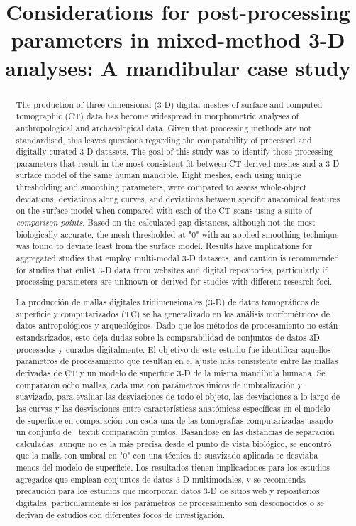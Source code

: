 \documentclass[review]{elsarticle}
\begin{document}
\begin{frontmatter}

\title{Considerations for post-processing parameters in mixed-method 3-D analyses: A mandibular case study}


\begin{abstract}
The production of three-dimensional (3-D) digital meshes of surface and computed tomographic (CT) data has become widespread in morphometric analyses of anthropological and archaeological data. Given that processing methods are not standardised, this leaves questions regarding the comparability of processed and digitally curated 3-D datasets. The goal of this study was to identify those processing parameters that result in the most consistent fit between CT-derived meshes and a 3-D surface model of the same human mandible. Eight meshes, each using unique thresholding and smoothing parameters, were compared to assess whole-object deviations, deviations along curves, and deviations between specific anatomical features on the surface model when compared with each of the CT scans using a suite of \textit{comparison points}. Based on the calculated gap distances, although not the most biologically accurate, the mesh thresholded at "0" with an applied smoothing technique was found to deviate least from the surface model. Results have implications for aggregated studies that employ multi-modal 3-D datasets, and caution is recommended for studies that enlist 3-D data from websites and digital repositories, particularly if processing parameters are unknown or derived for studies with different research foci.

\newpage
La producción de mallas digitales tridimensionales (3-D) de datos tomográficos de superficie y computarizados (TC) se ha generalizado en los análisis morfométricos de datos antropológicos y arqueológicos. Dado que los métodos de procesamiento no están estandarizados, esto deja dudas sobre la comparabilidad de conjuntos de datos 3D procesados ​​y curados digitalmente. El objetivo de este estudio fue identificar aquellos parámetros de procesamiento que resultan en el ajuste más consistente entre las mallas derivadas de CT y un modelo de superficie 3-D de la misma mandíbula humana. Se compararon ocho mallas, cada una con parámetros únicos de umbralización y suavizado, para evaluar las desviaciones de todo el objeto, las desviaciones a lo largo de las curvas y las desviaciones entre características anatómicas específicas en el modelo de superficie en comparación con cada una de las tomografías computarizadas usando un conjunto de \ textit {comparación puntos}. Basándose en las distancias de separación calculadas, aunque no es la más precisa desde el punto de vista biológico, se encontró que la malla con umbral en "0" con una técnica de suavizado aplicada se desviaba menos del modelo de superficie. Los resultados tienen implicaciones para los estudios agregados que emplean conjuntos de datos 3-D multimodales, y se recomienda precaución para los estudios que incorporan datos 3-D de sitios web y repositorios digitales, particularmente si los parámetros de procesamiento son desconocidos o se derivan de estudios con diferentes focos de investigación.
\end{abstract}


\end{frontmatter}
\end{document}
